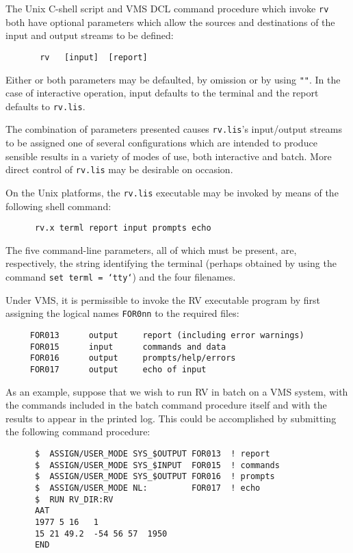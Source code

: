 The Unix C-shell script and VMS DCL command procedure which invoke
{\tt{rv}} both have optional parameters which allow the sources and
destinations of the input and output streams to be defined:

\begin{verbatim}
       rv   [input]  [report]
\end{verbatim}

Either or both parameters may be defaulted, by omission or by using
{\tt{""}}.  In the case of interactive operation, input defaults to the
terminal and the report defaults to {\tt{rv.lis}}.

The combination of parameters presented causes {\tt{rv.lis}}'s
input/output streams to be assigned one of several configurations which
are intended to produce sensible results in a variety of modes of use,
both interactive and batch.  More direct control of {\tt{rv.lis}} may
be desirable on occasion.

On the Unix platforms, the {\tt{rv.lis}} executable may be invoked by
means of the following shell command:

\begin{verbatim}
      rv.x terml report input prompts echo
\end{verbatim}

The five command-line parameters, all of which must be present,
are, respectively, the string identifying the terminal (perhaps
obtained by using the command {\tt{set terml = `tty`}}) and the
four filenames.

Under VMS, it is permissible to invoke the RV executable program
by first assigning the logical names {\tt{FOR0nn}} to the required
files:

\begin{verbatim}
     FOR013      output     report (including error warnings)
     FOR015      input      commands and data
     FOR016      output     prompts/help/errors
     FOR017      output     echo of input
\end{verbatim}

As an example, suppose that we wish to run RV in batch on a VMS system,
with the commands included in the batch command procedure itself and
with the results to appear in the printed log.  This could be
accomplished by submitting the following command procedure:

\begin{verbatim}
      $  ASSIGN/USER_MODE SYS_$OUTPUT FOR013  ! report
      $  ASSIGN/USER_MODE SYS_$INPUT  FOR015  ! commands
      $  ASSIGN/USER_MODE SYS_$OUTPUT FOR016  ! prompts
      $  ASSIGN/USER_MODE NL:         FOR017  ! echo
      $  RUN RV_DIR:RV
      AAT
      1977 5 16   1
      15 21 49.2  -54 56 57  1950
      END
\end{verbatim}

